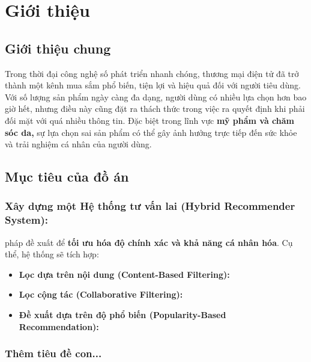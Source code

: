 \chapter{Giới thiệu}
\section{Giới thiệu chung}
Trong thời đại công nghệ số phát triển nhanh chóng, thương mại điện tử đã trở thành một kênh mua sắm phổ biến, tiện lợi và hiệu quả đối với người tiêu dùng. Với số lượng sản phẩm ngày càng đa dạng, người dùng có nhiều lựa chọn hơn bao giờ hết, nhưng điều này cũng đặt ra thách thức trong việc ra quyết định khi phải đối mặt với quá nhiều thông tin. Đặc biệt trong lĩnh vực\textbf{ mỹ phẩm và chăm sóc da,} sự lựa chọn sai sản phẩm có thể gây ảnh hưởng trực tiếp đến sức khỏe và trải nghiệm cá nhân của người dùng.

\section{Mục tiêu của đồ án}

\subsection{Xây dựng một Hệ thống tư vấn lai (Hybrid Recommender System):}

pháp đề xuất để \textbf{tối ưu hóa độ chính xác và khả năng cá nhân hóa}. Cụ thể, hệ thống sẽ tích hợp:
\begin{itemize}
    \item \textbf{Lọc dựa trên nội dung (Content-Based Filtering):} 
    \item \textbf{Lọc cộng tác (Collaborative Filtering):}    \item \textbf{Đề xuất dựa trên độ phổ biến (Popularity-Based Recommendation):} 
\end{itemize}

\subsection{Thêm tiêu đề con...}